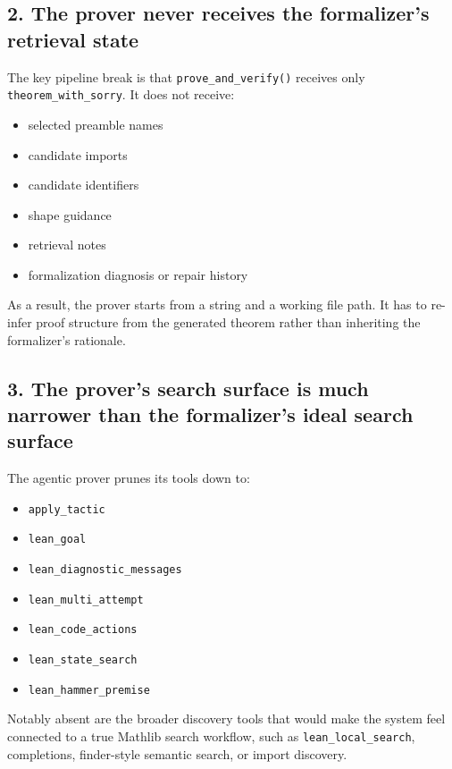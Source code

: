 \documentclass[11pt]{article}
\begin{document}
\subsection*{2. The prover never receives the formalizer's retrieval state}

The key pipeline break is that \texttt{prove\_and\_verify()} receives only
\texttt{theorem\_with\_sorry}. It does not receive:

\begin{itemize}[leftmargin=1.5em]
  \item selected preamble names
  \item candidate imports
  \item candidate identifiers
  \item shape guidance
  \item retrieval notes
  \item formalization diagnosis or repair history
\end{itemize}

As a result, the prover starts from a string and a working file path. It has to
re-infer proof structure from the generated theorem rather than inheriting the
formalizer's rationale.

\subsection*{3. The prover's search surface is much narrower than the formalizer's ideal search surface}

The agentic prover prunes its tools down to:

\begin{itemize}[leftmargin=1.5em]
  \item \texttt{apply\_tactic}
  \item \texttt{lean\_goal}
  \item \texttt{lean\_diagnostic\_messages}
  \item \texttt{lean\_multi\_attempt}
  \item \texttt{lean\_code\_actions}
  \item \texttt{lean\_state\_search}
  \item \texttt{lean\_hammer\_premise}
\end{itemize}

Notably absent are the broader discovery tools that would make the system feel
connected to a true Mathlib search workflow, such as \texttt{lean\_local\_search},
completions, finder-style semantic search, or import discovery.
\end{document}
